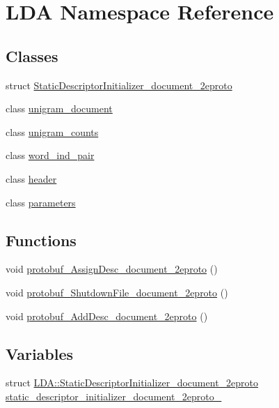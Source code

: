 \hypertarget{namespace_l_d_a}{
\section{LDA Namespace Reference}
\label{namespace_l_d_a}
}
\subsection*{Classes}
\begin{DoxyCompactItemize}
\item 
struct \hyperlink{struct_l_d_a_1_1_static_descriptor_initializer__document__2eproto}{StaticDescriptorInitializer\_\-document\_\-2eproto}
\item 
class \hyperlink{class_l_d_a_1_1unigram__document}{unigram\_\-document}
\item 
class \hyperlink{class_l_d_a_1_1unigram__counts}{unigram\_\-counts}
\item 
class \hyperlink{class_l_d_a_1_1word__ind__pair}{word\_\-ind\_\-pair}
\item 
class \hyperlink{class_l_d_a_1_1header}{header}
\item 
class \hyperlink{class_l_d_a_1_1parameters}{parameters}
\end{DoxyCompactItemize}
\subsection*{Functions}
\begin{DoxyCompactItemize}
\item 
void \hyperlink{namespace_l_d_a_a9c33eff2aecb2f5f4b81b24bf436dd34}{protobuf\_\-AssignDesc\_\-document\_\-2eproto} ()
\item 
void \hyperlink{namespace_l_d_a_abcd9acc44a8c440081fa76409c9083dd}{protobuf\_\-ShutdownFile\_\-document\_\-2eproto} ()
\item 
void \hyperlink{namespace_l_d_a_a0e92f0f45237dbf05ed3e40d1d937424}{protobuf\_\-AddDesc\_\-document\_\-2eproto} ()
\end{DoxyCompactItemize}
\subsection*{Variables}
\begin{DoxyCompactItemize}
\item 
struct \hyperlink{struct_l_d_a_1_1_static_descriptor_initializer__document__2eproto}{LDA::StaticDescriptorInitializer\_\-document\_\-2eproto} \hyperlink{namespace_l_d_a_a653847a5d3b27abb88be2fb3b865619d}{static\_\-descriptor\_\-initializer\_\-document\_\-2eproto\_\-}
\end{DoxyCompactItemize}


